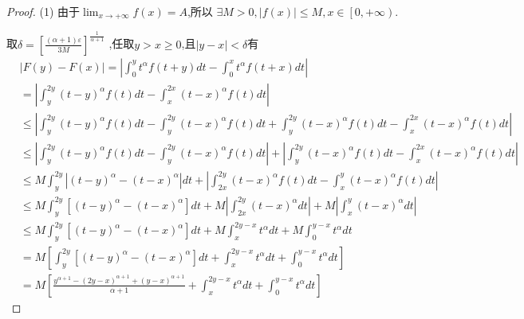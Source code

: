\documentclass[lang=cn,newtx,10pt,scheme=chinese]{../Template/elegantbook}
\begin{document}
\begin{proof}
(1)
由于$\lim_{x\rightarrow +\infty} f\left( x \right) =A$,所以
$\exists M>0,\left| f\left( x \right) \right|\leqslant M,x\in \left[ 0,+\infty \right) $.

取$\delta =\left[ \frac{\left( \alpha +1 \right) \varepsilon}{3M} \right] ^{\frac{1}{\alpha +1}}$
,任取$y>x \geqslant 0$,且$\left| y-x \right|<\delta $有
\begin{align}
&\left| F\left( y \right) -F\left( x \right) \right|=\left| \int_0^y{t^{\alpha}}f\left( t+y \right) dt-\int_0^x{t^{\alpha}}f\left( t+x \right) dt \right| \nonumber
\\
&=\left| \int_y^{2y}{\left( t-y \right) ^{\alpha}}f\left( t \right) dt-\int_x^{2x}{\left( t-x \right) ^{\alpha}}f\left( t \right) dt \right| \nonumber
\\
&\leqslant \left| \int_y^{2y}{\left( t-y \right) ^{\alpha}}f\left( t \right) dt-\int_y^{2y}{\left( t-x \right) ^{\alpha}}f\left( t \right) dt+\int_y^{2y}{\left( t-x \right) ^{\alpha}}f\left( t \right) dt-\int_x^{2x}{\left( t-x \right) ^{\alpha}}f\left( t \right) dt \right| \nonumber
\\
&\leqslant \left| \int_y^{2y}{\left( t-y \right) ^{\alpha}}f\left( t \right) dt-\int_y^{2y}{\left( t-x \right) ^{\alpha}}f\left( t \right) dt \right|+\left| \int_y^{2y}{\left( t-x \right) ^{\alpha}}f\left( t \right) dt-\int_x^{2x}{\left( t-x \right) ^{\alpha}}f\left( t \right) dt \right| \nonumber
\\
&\leqslant M\int_y^{2y}{\left| \left( t-y \right) ^{\alpha}-\left( t-x \right) ^{\alpha} \right|}dt+\left| \int_{2x}^{2y}{\left( t-x \right) ^{\alpha}}f\left( t \right) dt-\int_x^y{\left( t-x \right) ^{\alpha}}f\left( t \right) dt \right| \nonumber
\\
&\leqslant M\int_y^{2y}{\left[ \left( t-y \right) ^{\alpha}-\left( t-x \right) ^{\alpha} \right]}dt+M\left| \int_{2x}^{2y}{\left( t-x \right) ^{\alpha}}dt \right|+M\left| \int_x^y{\left( t-x \right) ^{\alpha}}dt \right| \nonumber
\\
&\leqslant M\int_y^{2y}{\left[ \left( t-y \right) ^{\alpha}-\left( t-x \right) ^{\alpha} \right]}dt+M\int_x^{2y-x}{t^{\alpha}}dt+M\int_0^{y-x}{t^{\alpha}}dt \nonumber
\\
&=M\left[ \int_y^{2y}{\left[ \left( t-y \right) ^{\alpha}-\left( t-x \right) ^{\alpha} \right]}dt+\int_x^{2y-x}{t^{\alpha}}dt+\int_0^{y-x}{t^{\alpha}}dt \right]  \nonumber
\\
&=M\left[ \frac{y^{\alpha +1}-\left( 2y-x \right) ^{\alpha +1}+\left( y-x \right) ^{\alpha +1}}{\alpha +1}+\int_x^{2y-x}{t^{\alpha}}dt+\int_0^{y-x}{t^{\alpha}}dt \right]  \nonumber

\end{align}
\end{proof}
\end{document}
